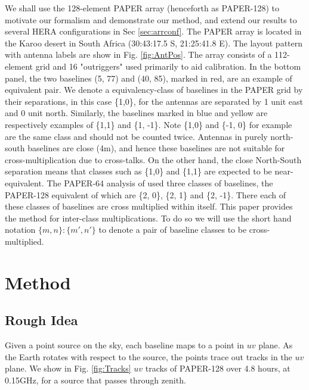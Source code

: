 \documentclass[twocolumn,apj,numberedappendix]{emulateapj}
\renewcommand\[{\begin{equation}}
\renewcommand\]{\end{equation}}
\begin{document}
We shall use the 128-element PAPER array (henceforth as PAPER-128) to motivate our formalism and demonstrate our method, and extend our results to several HERA configurations in Sec \ref{sec:arrconf}. 
The PAPER array is located in the Karoo desert in South Africa (30:43:17.5
S, 21:25:41.8 E). The layout pattern with antenna labels are show
in Fig. \ref{fig:AntPos}. The array consists of a 112-element grid and 16 "outriggers" used primarily to aid calibration.  In the bottom panel, the two baselines (5, 77) and (40, 85), marked in red, are an example of equivalent pair. We denote a equivalency-class of baselines in the PAPER grid by their separations, in this case  \{1,0\}, for the
antennas are separated by 1 unit east and 0 unit north. Similarly,
the baselines marked in blue and yellow are respectively examples
of \{1,1\} and \{1, -1\}.
Note \{1,0\} and \{-1, 0\} for example are the same class and should
not be counted twice. Antennas in purely north-south baselines
are close (4m), and hence these baselines are not suitable
for cross-multiplication due to cross-talks. On the other hand, the close North-South separation means that classes such as \{1,0\} and  \{1,1\} are expected to be near-equivalent. The PAPER-64 analysis of \cite{Ali2015} used three classes of baselines, the PAPER-128
equivalent of which are 
\{2, 0\}, \{2, 1\} and \{2, -1\}. There each of these classes
of baselines are cross multiplied within itself. This paper provides the method for inter-class multiplications. To do so we will use the short hand notation $\{m,n\}:\{m',n'\}$ to denote a pair of baseline classes to be cross-multiplied. 


\section{Method}

\subsection{Rough Idea \label{sec:tracks}}



Given a point source on the sky, each baseline maps to a point in $uv$ plane. As the Earth rotates with respect to
the source, the points trace out tracks in the $uv$ plane. 
We show in Fig. \ref{fig:Tracks} $uv$ tracks of PAPER-128 over 4.8 hours, at 0.15GHz, for a source that passes through zenith. 
\end{document}
